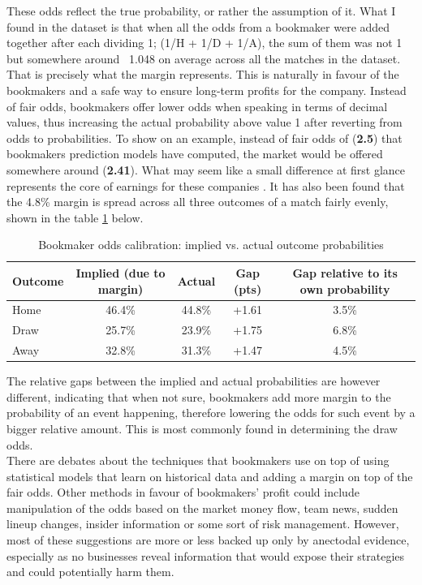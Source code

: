 \documentclass{article}
\begin{document}
These odds reflect the true probability, or rather the assumption of it. What I found in the \cite{EPL_dataset} dataset is that when all the odds from a bookmaker were added together after each dividing 1; (1/H + 1/D + 1/A), the sum of them was not 1 but somewhere around ~1.048 on average across all the matches in the dataset. That is precisely what the margin represents. This is naturally in favour of the bookmakers and a safe way to ensure long-term profits for the company. Instead of fair odds, bookmakers offer lower odds when speaking in terms of decimal values, thus increasing the actual probability above value 1 after reverting from odds to probabilities. To show on an example, instead of fair odds of (\textbf{2.5}) that bookmakers prediction models have computed, the market would be offered somewhere around (\textbf{2.41}). What may seem like a small difference at first glance represents the core of earnings for these companies \cite{Levitt2004Gambling}. It has also been found that the 4.8\% margin is spread across all three outcomes of a match fairly evenly, shown in the table \ref{tab:odds_calibration} below.
\begin{table}[H]
\centering
\begin{tabular}{lcccc}
\toprule
\textbf{Outcome} & \textbf{Implied (due to margin)} & \textbf{Actual} & \textbf{Gap (pts)} & \textbf{Gap relative to its own probability} \\
\midrule
Home & 46.4\% & 44.8\% & +1.61 & 3.5\% \\
Draw & 25.7\% & 23.9\% & +1.75 & 6.8\% \\
Away & 32.8\% & 31.3\% & +1.47 & 4.5\% \\
\bottomrule
\end{tabular}
\caption{Bookmaker odds calibration: implied vs. actual outcome probabilities}
\label{tab:odds_calibration}
\end{table}
The relative gaps between the implied and actual probabilities are however different, indicating that when not sure, bookmakers add more margin to the probability of an event happening, therefore lowering the odds for such event by a bigger relative amount. This is most commonly found in determining the draw odds. 
\\
There are debates about the techniques that bookmakers use on top of using statistical models that learn on historical data and adding a margin on top of the fair odds. Other methods in favour of bookmakers' profit could include manipulation of the odds based on the market money flow, team news, sudden lineup changes, insider information or some sort of risk management. However, most of these suggestions are more or less backed up only by anectodal evidence, especially as no businesses reveal information that would expose their strategies and could potentially harm them.
\end{document}
